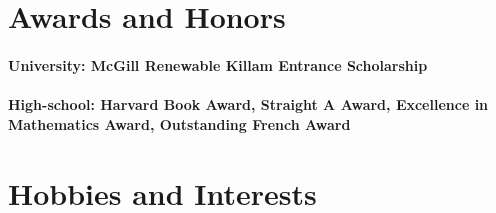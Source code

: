 \documentclass{article}
\begin{document}
% 

\section{Awards and Honors}

\paragraph{University: McGill Renewable Killam Entrance Scholarship}

\paragraph{High-school: Harvard Book Award, Straight A Award, Excellence in
  Mathematics Award, Outstanding French Award}


% 

\section{Hobbies and Interests}
\end{document}
